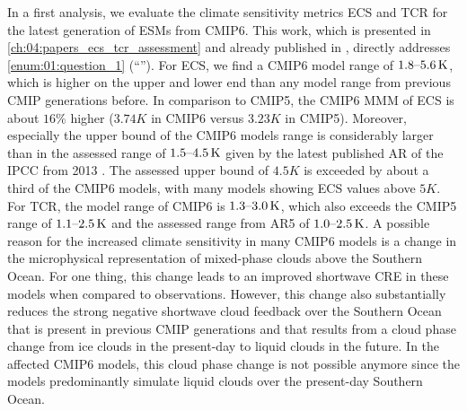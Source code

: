 In a first analysis, we evaluate the climate sensitivity metrics \ac{ECS} and
\ac{TCR} for the latest generation of \acp{ESM} from \acs{CMIP}6. This work,
which is presented in \cref{ch:04:papers_ecs_tcr_assessment} and already
published in \textcite{Bock2020, Meehl2020}, directly addresses
\cref{enum:01:question_1} (\enquote{\emph{\KeyScienceQuestionOne{}}}). For
\ac{ECS}, we find a \acs{CMIP}6 model range of $\rangeunit{1.8}{5.6}{K}$, which
is higher on the upper and lower end than any model range from previous
\ac{CMIP} generations before. In comparison to \acs{CMIP}5, the \acs{CMIP}6
\ac{MMM} of \ac{ECS} is about $16 \unit{\%}$ higher ($3.74 \unit{K}$ in
\acs{CMIP}6 versus $3.23 \unit{K}$ in \acs{CMIP}5). Moreover, especially the
upper bound of the \acs{CMIP}6 models range is considerably larger than in the
assessed range of $\rangeunit{1.5}{4.5}{K}$ given by the latest published
\ac{AR} of the \ac{IPCC} from 2013 \autocite{Stocker2013}. The assessed upper
bound of $4.5 \unit{K}$ is exceeded by about a third of the \acs{CMIP}6 models,
with many models showing \ac{ECS} values above $5 \unit{K}$. For \ac{TCR}, the
model range of \acs{CMIP}6 is $\rangeunit{1.3}{3.0}{K}$, which also exceeds the
\acs{CMIP}5 range of $\rangeunit{1.1}{2.5}{K}$ and the assessed range from
\acs{AR}5 of $\rangeunit{1.0}{2.5}{K}$. A possible reason for the increased
climate sensitivity in many \acs{CMIP}6 models is a change in the microphysical
representation of mixed-phase clouds above the Southern Ocean. For one thing,
this change leads to an improved shortwave \ac{CRE} in these models when
compared to observations. However, this change also substantially reduces the
strong negative shortwave cloud feedback over the Southern Ocean that is
present in previous \ac{CMIP} generations and that results from a cloud phase
change from ice clouds in the present-day to liquid clouds in the future. In
the affected \acs{CMIP}6 models, this cloud phase change is not possible
anymore since the models predominantly simulate liquid clouds over the
present-day Southern Ocean.

